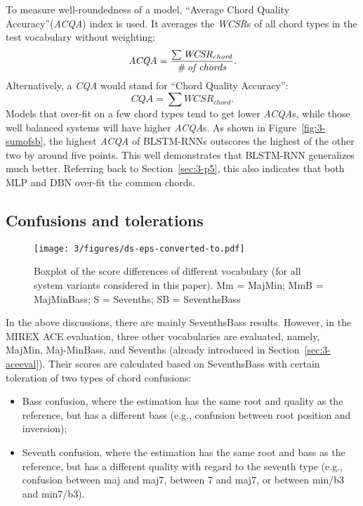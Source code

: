 To measure well-roundedness of a model, ``Average Chord Quality Accuracy''(\textit{ACQA}) index \cite{cho2014improved} is used. It averages the \textit{WCSR}s of all chord types in the test vocabulary without weighting:
\begin{equation}
	\mathit{ACQA = {{\sum{WCSR_{chord}}} \over {\#\,of\,chords}}}.
	\label{eq:3-acqa}
\end{equation}
Alternatively, a \textit{CQA} would stand for ``Chord Quality Accuracy'':
\begin{equation}
\mathit{CQA = \sum{WCSR_{chord}}}.
\label{eq:3-cqa}
\end{equation}
Models that over-fit on a few chord types tend to get lower \textit{ACQA}s, while those well balanced systems will have higher \textit{ACQA}s. As shown in Figure~\ref{fig:3-sumofsb}, the highest \textit{ACQA} of BLSTM-RNNs outscores the highest of the other two by around five points. This well demonstrates that BLSTM-RNN generalizes much better. Referring back to Section~\ref{sec:3-p5}, this also indicates that both MLP and DBN over-fit the common chords.

\subsection{Confusions and tolerations} \label{sec:3-p8}

\begin{figure}[htb]
	\centering
	\texttt{[image: 3/figures/ds-eps-converted-to.pdf]}
	\caption{Boxplot of the score differences of different vocabulary (for all system variants considered in this paper). Mm = MajMin; MmB = MajMinBass; S = Sevenths; SB = SeventhsBass}
	\label{fig:3-ds}
\end{figure}

In the above discussions, there are mainly SeventhsBass results. However, in the MIREX ACE evaluation, three other vocabularies are evaluated, namely, MajMin, Maj-MinBass, and Sevenths (already introduced in Section~\ref{sec:3-aceeval}). Their scores are calculated based on SeventhsBass with certain toleration of two types of chord confusions:
\begin{itemize}
	\item Bass confusion, where the estimation has the same root and quality as the reference, but has a different bass (e.g., confusion between root position and inversion);
	\item Seventh confusion, where the estimation has the same root and bass as the reference, but has a different quality with regard to the seventh type (e.g., confusion between maj and maj7, between 7 and maj7, or between min/b3 and min7/b3).
\end{itemize}

